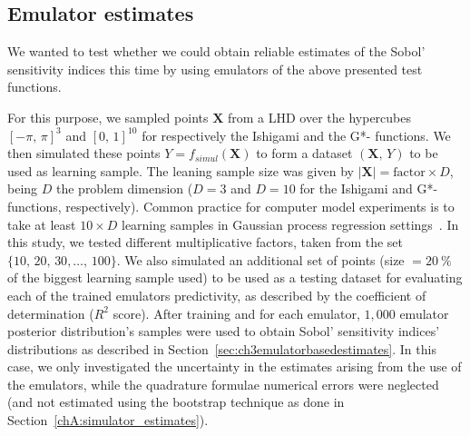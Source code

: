 %
%
%
\clearpage
\subsection{Emulator estimates}\label{chA:emulator_estimates}
We wanted to test whether we could obtain reliable estimates of the Sobol' sensitivity indices this time by using emulators of the above presented test functions.

\vspace{0.2cm}
For this purpose, we sampled points $\mathbf{X}$ from a LHD over the hypercubes $[-\pi,\,\pi]^3$ and $[0,\,1]^{10}$ for respectively the Ishigami and the G*- functions. We then simulated these points $Y=f_{simul}(\mathbf{X})$ to form a dataset $(\mathbf{X},\,Y)$ to be used as learning sample. The leaning sample size was given by $\vert\mathbf{X}\vert=\text{factor}\times D$, being $D$ the problem dimension ($D=3$ and $D=10$ for the Ishigami and G*- functions, respectively). Common practice for computer model experiments is to take at least $10\times D$ learning samples in Gaussian process regression settings~\cite{Rasmussen:2006}. In this study, we tested different multiplicative factors, taken from the set $\{10,\,20,\,30,\dots,\,100\}$. We also simulated an additional set of points (size $=\SI{20}{\percent}$ of the biggest learning sample used) to be used as a testing dataset for evaluating each of the trained emulators predictivity, as described by the coefficient of determination ($R^2$ score). After training and for each emulator, $1,000$ emulator posterior distribution's samples were used to obtain Sobol' sensitivity indices' distributions as described in Section~\ref{sec:ch3emulatorbasedestimates}. In this case, we only investigated the uncertainty in the estimates arising from the use of the emulators, while the quadrature formulae numerical errors were neglected (and not estimated using the bootstrap technique as done in Section~\ref{chA:simulator_estimates}).

